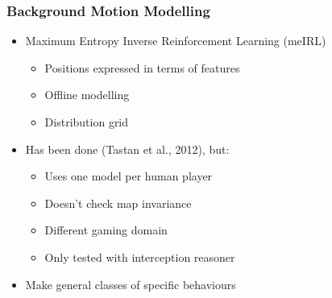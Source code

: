 \documentclass{beamer}
\begin{document}
\begin{frame}
    \frametitle{Background Motion Modelling}
    \begin{itemize}
        \item Maximum Entropy Inverse Reinforcement Learning (meIRL)
            \begin{itemize}
                \item Positions expressed in terms of features
                \item Offline modelling
                \item Distribution grid
            \end{itemize}
        \item Has been done (Tastan et al., 2012), but:
            \begin{itemize}
                \item Uses one model per human player
                \item Doesn't check map invariance
                \item Different gaming domain 
                \item Only tested with interception reasoner
                    \end {itemize}
                \item Make general classes of specific behaviours
            \end{itemize}
        \end{frame}
\end{document}
